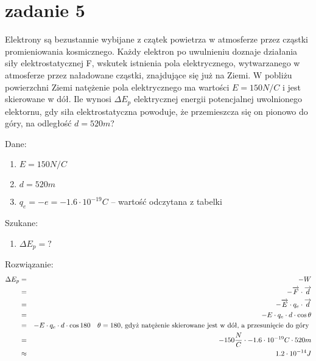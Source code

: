 \documentclass[svgnames]{report}
\begin{document}
\section{zadanie 5}
\begin{framed}
Elektrony są bezustannie wybijane z czątek powietrza w atmosferze przez cząstki promieniowania kosmicznego.
Każdy elektron po uwulnieniu doznaje działania siły elektrostatycznej F, wskutek istnienia pola elektrycznego, wytwarzanego w atmosferze przez naładowane cząstki, znajdujące się już na Ziemi. W pobliżu powierzchni Ziemi natężenie pola elektrycznego ma wartości $E = 150 N/C$ i jest skierowane w dół. Ile wynosi $\Delta E_p$ elektrycznej energii potencjalnej uwolnionego elektornu, gdy siła elektrostatyczna powoduje, że przemieszcza się on pionowo do góry, na odległość $d = 520m$?
\end{framed}
Dane:
\begin{enumerate}
	\item $E = 150 N/C$
	\item $d = 520m$
	\item $q_e = -e = -1.6 \cdot 10^{-19} C$ -- wartość odczytana z tabelki
\end{enumerate}
Szukane:
\begin{enumerate}
	\item $\Delta E_p = ?$
\end{enumerate}
Rozwiązanie:
\begin{eqnarray*}
\Delta E_p 	&=& -W	\\
			&=& -\overrightarrow{F} \cdot \overrightarrow{d}	\\
			&=& -\overrightarrow{E} \cdot q_e \cdot \overrightarrow{d}	\\
			&=& -E \cdot q_e \cdot d \cdot \cos{\theta}	\\
			&=&	-E \cdot q_e \cdot d \cdot \cos{180} \ \ \hbox{ $\theta=180$, gdyż natężenie skierowane jest w dół, a przesunięcie do góry } \\
			&=& -150 \frac{N}{C} \cdot -1.6 \cdot 10^{-19} C \cdot 520m	\\
			& \approx & 1.2 \cdot 10^{-14} J
\end{eqnarray*}
\end{document}
